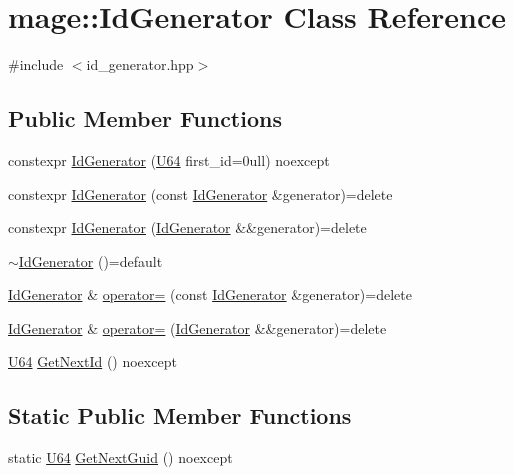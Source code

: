 \hypertarget{classmage_1_1_id_generator}{}\section{mage\+:\+:Id\+Generator Class Reference}
\label{classmage_1_1_id_generator}


{\ttfamily \#include $<$id\+\_\+generator.\+hpp$>$}

\subsection*{Public Member Functions}
\begin{DoxyCompactItemize}
\item 
constexpr \mbox{\hyperlink{classmage_1_1_id_generator_aabc8fb01d9c7be4ecc3ae78410b06563}{Id\+Generator}} (\mbox{\hyperlink{namespacemage_a6672cf3c861707ce4a3235a3eb43941d}{U64}} first\+\_\+id=0ull) noexcept
\item 
constexpr \mbox{\hyperlink{classmage_1_1_id_generator_af9031d6e7bdec72d7d46c975d3ff2476}{Id\+Generator}} (const \mbox{\hyperlink{classmage_1_1_id_generator}{Id\+Generator}} \&generator)=delete
\item 
constexpr \mbox{\hyperlink{classmage_1_1_id_generator_a1f1da4e89427aaad06adb665b95ca70a}{Id\+Generator}} (\mbox{\hyperlink{classmage_1_1_id_generator}{Id\+Generator}} \&\&generator)=delete
\item 
\mbox{\hyperlink{classmage_1_1_id_generator_a70161ab5b10294ebba1ace7a3b0f8d31}{$\sim$\+Id\+Generator}} ()=default
\item 
\mbox{\hyperlink{classmage_1_1_id_generator}{Id\+Generator}} \& \mbox{\hyperlink{classmage_1_1_id_generator_adf4539050d910996e914df51f22236c6}{operator=}} (const \mbox{\hyperlink{classmage_1_1_id_generator}{Id\+Generator}} \&generator)=delete
\item 
\mbox{\hyperlink{classmage_1_1_id_generator}{Id\+Generator}} \& \mbox{\hyperlink{classmage_1_1_id_generator_aeb8bfd849689d74eb450b0c1c2044086}{operator=}} (\mbox{\hyperlink{classmage_1_1_id_generator}{Id\+Generator}} \&\&generator)=delete
\item 
\mbox{\hyperlink{namespacemage_a6672cf3c861707ce4a3235a3eb43941d}{U64}} \mbox{\hyperlink{classmage_1_1_id_generator_ae51ebc69faac9974553b7c647981dc57}{Get\+Next\+Id}} () noexcept
\end{DoxyCompactItemize}
\subsection*{Static Public Member Functions}
\begin{DoxyCompactItemize}
\item 
static \mbox{\hyperlink{namespacemage_a6672cf3c861707ce4a3235a3eb43941d}{U64}} \mbox{\hyperlink{classmage_1_1_id_generator_af6df2ba2fb7172e7753c69a4aec1e6bf}{Get\+Next\+Guid}} () noexcept
\end{DoxyCompactItemize}
